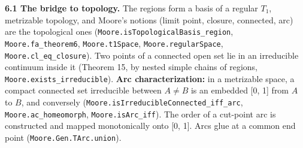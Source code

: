 \documentclass[11pt]{article}
\newcommand{\lean}[1]{\texttt{#1}}
\begin{document}
\textbf{6.1 The bridge to topology.} The regions form a basis of a regular $T_1$, metrizable topology, and Moore's notions (limit point, closure, connected, arc) are the topological ones (\lean{Moore.\hspace{0pt}isTopologicalBasis\_\hspace{0pt}region}, \lean{Moore.\hspace{0pt}fa\_\hspace{0pt}theorem6}, \lean{Moore.\hspace{0pt}t1Space}, \lean{Moore.\hspace{0pt}regularSpace}, \lean{Moore.\hspace{0pt}cl\_\hspace{0pt}eq\_\hspace{0pt}closure}). Two points of a connected open set lie in an irreducible continuum inside it (Theorem 15, by nested simple chains of regions, \lean{Moore.\hspace{0pt}exists\_\hspace{0pt}irreducible}). \textbf{Arc characterization:} in a metrizable space, a compact connected set irreducible between $A \neq B$ is an embedded [0, 1] from $A$ to $B$, and conversely (\lean{Moore.\hspace{0pt}isIrreducibleConnected\_\hspace{0pt}iff\_\hspace{0pt}arc}, \lean{Moore.\hspace{0pt}ac\_\hspace{0pt}homeomorph}, \lean{Moore.\hspace{0pt}isArc\_\hspace{0pt}iff}). The order of a cut-point arc is constructed and mapped monotonically onto [0, 1]. Arcs glue at a common end point (\lean{Moore.\hspace{0pt}Gen.\hspace{0pt}TArc.\hspace{0pt}union}).
\end{document}
